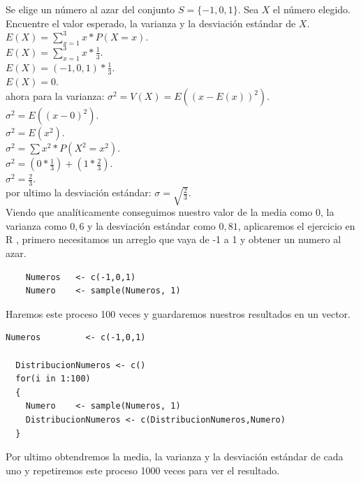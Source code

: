\documentclass[]{article}
\begin{document}
Se elige un número al azar del conjunto $ S = \{- 1, 0, 1\} $. Sea $ X $ el número elegido. Encuentre el valor esperado, la varianza y la desviación estándar de $ X $.\\
$E(X) = \sum_{x = 1}^{3} x * P(X = x)$.\\
$E(X) = \sum_{x = 1}^{3} x * \frac{1}{3}$.\\
$E(X) = (-1, 0, 1)* \frac{1}{3}$.\\
$E(X) = 0$.\\
ahora para la varianza:
$\sigma^{2} = V(X) = E((x-E(x))^{2})$.\\
$\sigma^{2} = E((x-0)^{2})$.\\
$\sigma^{2} = E(x^{2})$.\\
$\sigma^{2} = \sum x^{2} * P(X^{2} = x^{2})$.\\
$\sigma^{2}  = (0 * \frac{1}{3}) + (1 * \frac{2}{3})$.\\
$\sigma^{2}  = \frac{2}{3}$.\\
por ultimo la desviación estándar:
$\sigma = \sqrt{\frac{2}{3}}$.\\
Viendo que analíticamente conseguimos nuestro valor de la media como $0$, la varianza como $0,6$ y la desviación estándar como $0,81$, aplicaremos el ejercicio en R , primero necesitamos un arreglo que vaya de -1 a 1 y obtener un numero al azar.
      \begin{lstlisting}
    Numeros   <- c(-1,0,1)
    Numero    <- sample(Numeros, 1)

      \end{lstlisting}
Haremos este proceso 100 veces y guardaremos nuestros resultados en un vector.
      \begin{lstlisting}
Numeros         <- c(-1,0,1)

  DistribucionNumeros <- c()
  for(i in 1:100)
  {
    Numero    <- sample(Numeros, 1)
    DistribucionNumeros <- c(DistribucionNumeros,Numero)
  }

      \end{lstlisting}
Por ultimo obtendremos la media, la varianza y la desviación estándar de cada uno y repetiremos este proceso 1000 veces para ver el resultado.
\end{document}
